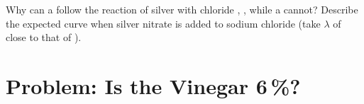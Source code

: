 \begin{exercise}[$\star\star\star$]\label{exo:g12:ph-conductivity-titrations:15}
Why can a  follow the reaction of silver 
with chloride , , while a  cannot? Describe the expected curve when silver nitrate is
added to sodium chloride (take $\lambda$ of  close to that of
).
\end{exercise}

\section{Problem: Is the Vinegar 6\,\%?}

